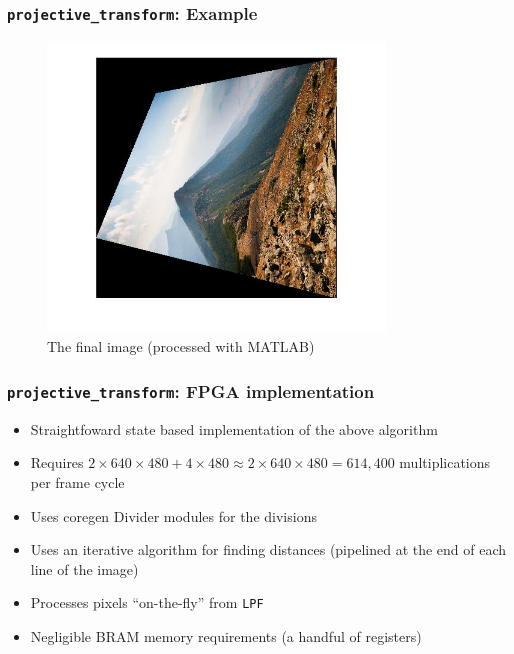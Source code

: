\documentclass{beamer}
\begin{document}
\begin{frame}
	\frametitle{{\tt projective\_transform}: Example}
	\begin{figure}
		\centering
		\includegraphics[width=0.8\textwidth]{images/skew_example/projected_final.jpg}
		\caption{The final image (processed with MATLAB)}
	\end{figure}
\end{frame}

\begin{frame}
	\frametitle{{\tt projective\_transform}: FPGA implementation}
	\begin{itemize}
	\item<1-> Straightfoward state based implementation of the above algorithm
	\item<2-> Requires $2\times640\times480 + 4\times480 \approx 2\times640\times480 = 614,400$ multiplications per frame cycle
	\item<3-> Uses coregen Divider modules for the divisions
	\item<4-> Uses an iterative algorithm for finding distances (pipelined at the end of each line of the image)
	\item<5-> Processes pixels ``on-the-fly'' from {\tt LPF}
	\item<6-> Negligible BRAM memory requirements (a handful of registers)
	\end{itemize}
\end{frame}
\end{document}
